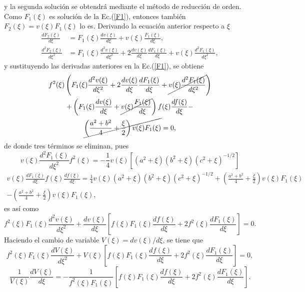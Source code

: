 \documentclass[paper=letter, fontsize=12pt,]{article}
\begin{document}
y la segunda solución se obtendrá mediante el método de reducción de orden. Como $F_1(\xi)$ es solución de la Ec.(\ref{F1}), entonces también 
$F_2(\xi)=v(\xi)F_1(\xi)$ lo es. Derivando la ecuación anterior respecto a $\xi$
\begin{align}
    \frac{dF_2(\xi)}{d\xi}&=F_1(\xi)\frac{dv(\xi)}{d\xi}+v(\xi)\frac{F_1(\xi)}{d\xi},\\
    \frac{d^2F_2(\xi)}{d\xi^2}&=F_1(\xi)\frac{d^2v(\xi)}{d\xi^2}+2\frac{dv(\xi)}{d\xi}\frac{dF_1(\xi)}{d\xi}+v(\xi)\frac{d^2F_1(\xi)}{d\xi^2},
\end{align}
y sustituyendo las derivadas anteriores en la Ec.(\ref{F1}), se obtiene
\begin{multline}
    f^2(\xi)\left(F_1(\xi)\frac{d^2v(\xi)}{d\xi^2}+2\frac{dv(\xi)}{d\xi}\frac{dF_1(\xi)}{d\xi}+\cancel{v(\xi)\frac{d^2F_1(\xi)}{d\xi^2}}\right)\\+\left(F_1(\xi)\frac{dv(\xi)}{d\xi}+\cancel{v(\xi)\frac{F_1(\xi)}{d\xi}}\right)f(\xi)\frac{df(\xi)}{d\xi}-\\ \cancel{\left(\frac{a^2+b^2}{4}+\frac{\xi}{2}\right)v(\xi)F_1(\xi)}=0,
\end{multline}
de donde tres términos se eliminan, pues
\begin{equation*}
    v(\xi)\frac{d^2F_1(\xi)}{d\xi^2}f^2(\xi)=-\frac{1}{4}v(\xi)[(a^2+\xi)(b^2+\xi)(c^2+\xi)^{-1/2}]
\end{equation*}
\begin{multline*}
    v(\xi)\frac{dF_1(\xi)}{d\xi}f(\xi)\frac{df(\xi)}{d\xi}=\frac{1}{4}v(\xi)(a^2+\xi)(b^2+\xi)(c^2+\xi)^{-1/2}+\left(\frac{a^2+b^2}{4}+\frac{\xi}{2}\right)v(\xi)F_1(\xi)\\-\left(\frac{a^2+b^2}{4}+\frac{\xi}{2}\right)v(\xi)F_1(\xi),
\end{multline*}
es así como
\begin{equation*}
    f^2(\xi)F_1(\xi)\frac{d^2v(\xi)}{d\xi^2}+\frac{dv(\xi)}{d\xi}\left[f(\xi)F_1(\xi)\frac{df(\xi)}{d\xi}+2f^2(\xi)\frac{dF_1(\xi)}{d\xi}\right]=0.
\end{equation*}
Haciendo el cambio de variable $V(\xi)=dv(\xi)/d\xi$, se tiene que
\begin{equation*}
    f^2(\xi)F_1(\xi)\frac{dV(\xi)}{d\xi^2}+V(\xi)\left[f(\xi)F_1(\xi)\frac{df(\xi)}{d\xi}+2f^2(\xi)\frac{dF_1(\xi)}{d\xi}\right]=0,    
\end{equation*}
\begin{equation*}
    \frac{1}{V(\xi)}\frac{dV(\xi)}{d\xi}=-\frac{1}{f^2(\xi)F_1(\xi)}\left[f(\xi)F_1(\xi)\frac{df(\xi)}{d\xi}+2f^2(\xi)\frac{dF_1(\xi)}{d\xi}\right].
\end{equation*}
\end{document}
